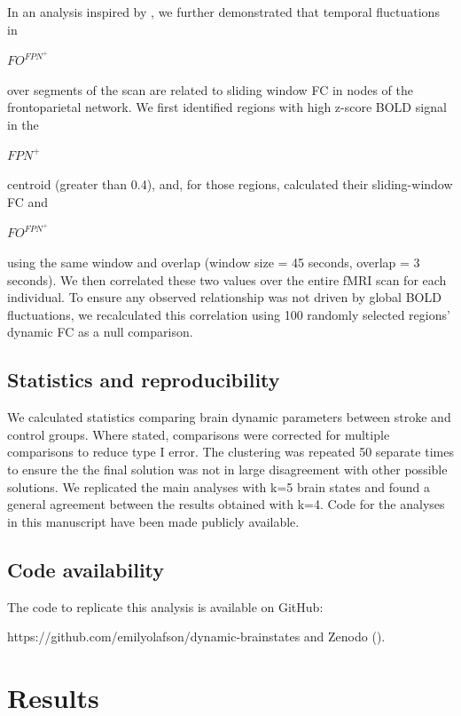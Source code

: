 \documentclass[phd,tocprelim]{cornell}
\begin{document}
    In an analysis inspired by \cite{Baker2014-zt}, we further demonstrated that temporal fluctuations in  \begin{Large}$FO^{FPN^+}$ \end{Large} over segments of the scan are related to sliding window FC in nodes of the frontoparietal network. We first identified regions with high z-score BOLD signal in the  \begin{Large}$FPN^+$ \end{Large} centroid (greater than 0.4), and, for those regions, calculated their sliding-window FC and  \begin{Large}$FO^{FPN^+}$ \end{Large} using the same window and overlap (window size = 45 seconds, overlap = 3 seconds). We then correlated these two values over the entire fMRI scan for each individual. To ensure any observed relationship was not driven by global BOLD fluctuations, we recalculated this correlation using 100 randomly selected regions' dynamic FC as a null comparison.
    
    \subsection{Statistics and reproducibility}
    We calculated statistics comparing brain dynamic parameters between stroke and control groups. Where stated, comparisons were corrected for multiple comparisons to reduce type I error. The clustering was repeated 50 separate times to ensure the the final solution was not in large disagreement with other possible solutions. We replicated the main analyses with k=5 brain states and found a general agreement between the results obtained with k=4. Code for the analyses in this manuscript have been made publicly available. 
    
	\subsection{Code availability}
	 The code to replicate this analysis is available on GitHub: 
	 
	 https://github.com/emilyolafson/dynamic-brainstates and Zenodo (\cite{Olafson2022-ul}).
	 
\section{Results}
\end{document}
